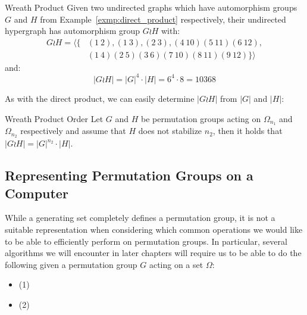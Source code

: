 \begin{exmp}{Wreath Product}
  Given two undirected graphs which have automorphism groups $G$ and $H$ from
  Example~\ref{exmp:direct_product} respectively, their undirected hypergraph has
  automorphism group $G \wr H$ with:
  \begin{align*}
    G \wr H = \langle\{&(1\ 2),(1\ 3),(2\ 3),(4\ 10)(5\ 11)(6\ 12), \\
                       &(1\ 4)(2\ 5)(3\ 6)(7\ 10)(8\ 11)(9\ 12)\}\rangle
  \end{align*}
  and:
  \begin{equation*}
    |G \wr H| = |G|^4 \cdot |H| = 6^4 \cdot 8 = 10368
  \end{equation*}
\end{exmp}
%
As with the direct product, we can easily determine $|G \wr H|$ from $|G|$ and
$|H|$:

\begin{thm}{Wreath Product Order}
  Let $G$ and $H$ be permutation groups acting on $\Omega_{n_1}$ and
  $\Omega_{n_2}$ respectively and assume that $H$ does not stabilize $n_2$,
  then it holds that $|G \wr H| = |G|^{n_2} \cdot |H|$.
\end{thm}

\subsection{Representing Permutation Groups on a Computer}
\label{subsec:pg_representing_permutation_groups_on_a_computer}

While a generating set completely defines a permutation group, it is not a
suitable representation when considering which common operations we would like
to be able to efficiently perform on permutation groups. In particular,
several algorithms we will encounter in later chapters will require us to be
able to do the following given a permutation group $G$ acting on a set $\Omega$:

\begin{itemize}
  \item {} (1)
  \item {} (2)
\end{itemize}


